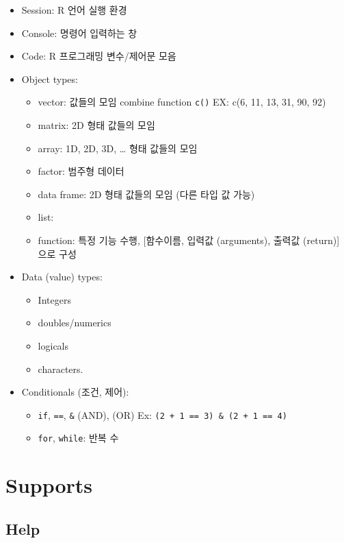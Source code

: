 \documentclass[
]{book}
\providecommand{\tightlist}{%
  \setlength{\itemsep}{0pt}\setlength{\parskip}{0pt}}
\begin{document}
\begin{itemize}
\tightlist
\item
  Session: R 언어 실행 환경
\item
  Console: 명령어 입력하는 창
\item
  Code: R 프로그래밍 변수/제어문 모음
\item
  Object types:

  \begin{itemize}
  \tightlist
  \item
    vector: 값들의 모임 combine function \texttt{c()} EX: c(6, 11, 13, 31, 90, 92)
  \item
    matrix: 2D 형태 값들의 모임
  \item
    array: 1D, 2D, 3D, \ldots{} 형태 값들의 모임
  \item
    factor: 범주형 데이터
  \item
    data frame: 2D 형태 값들의 모임 (다른 타입 값 가능)
  \item
    list:
  \item
    function: 특정 기능 수행, {[}함수이름, 입력값 (arguments), 출력값 (return){]} 으로 구성
  \end{itemize}
\item
  Data (value) types:

  \begin{itemize}
  \tightlist
  \item
    Integers
  \item
    doubles/numerics
  \item
    logicals
  \item
    characters.
  \end{itemize}
\item
  Conditionals (조건, 제어):

  \begin{itemize}
  \tightlist
  \item
    \texttt{if}, \texttt{==}, \texttt{\&} (AND), \texttt{\textbar{}} (OR) Ex: \texttt{(2\ +\ 1\ ==\ 3)\ \&\ (2\ +\ 1\ ==\ 4)}
  \item
    \texttt{for}, \texttt{while}: 반복 수
  \end{itemize}
\end{itemize}

\hypertarget{supports}{%
\section{Supports}\label{supports}}

\hypertarget{help}{%
\subsection{Help}\label{help}}
\end{document}
